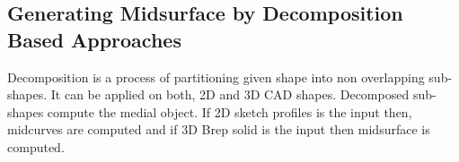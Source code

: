 

\subsection{Generating Midsurface by Decomposition Based Approaches}

Decomposition is a process of partitioning given shape into non overlapping sub-shapes. It can be applied on both, 2D and 3D CAD shapes. Decomposed sub-shapes compute the medial object. If 2D sketch profiles is the input then, midcurves are computed and if 3D Brep solid is the input then midsurface is computed. 


